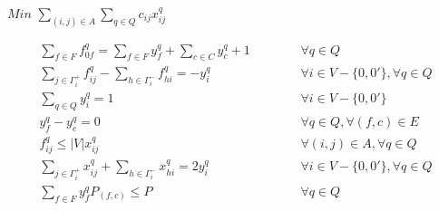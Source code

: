 \documentclass[12pt]{article}
\begin{document}
\newpage
\begin{center}
 $Min \,\, \sum\limits_{(i,j) \in A} {\sum \limits_{q \in Q} {c_{ij} x^{q}_{ij}}}$
\end{center}

\begin{eqnarray}
\label{eq01}
  \sum\limits_{f \in F} {f^q_{0f}} = \sum\limits_{f \in F} {y^q_f} + \sum\limits_{c \in C} {y^q_c} + 1 & \hspace{1cm} & \forall q \in Q \\
\label{eq02}
  \sum\limits_{j \in \Gamma^+_i} {f^q_{ij}} - \sum\limits_{h \in \Gamma^-_i}{f^q_{hi}} = -y^q_i & \hspace{1cm} & \forall i \in V - \{0,0'\}, \forall q \in Q \\
\label{eq03}
  \sum\limits_{q \in Q} {y^q_i} = 1 & \hspace{1cm} & \forall i \in V - \{0,0'\} \\
\label{eq04}
  y^q_f - y^q_c = 0 & \hspace{1cm} & \forall q \in Q, \forall (f,c) \in E \\  
\label{eq05}
  f^q_{ij} \le |V| x^q_{ij} & \hspace{1cm} & \forall (i,j) \in A, \forall q \in Q \\
\label{eq06}
  \sum\limits_{j \in \Gamma^+_i}{x^q_{ij}} + \sum\limits_{h \in \Gamma^-_i}{x^q_{hi}} = 2y^q_i & \hspace{1cm} & \forall i \in V - \{0,0'\}, \forall q \in Q \\
\label{eq07}
  \sum\limits_{f \in F} {y^{q}_f P_{(f,c)}} \le P & \hspace{1cm} & \forall q \in Q 
\end{eqnarray}
\end{document}
